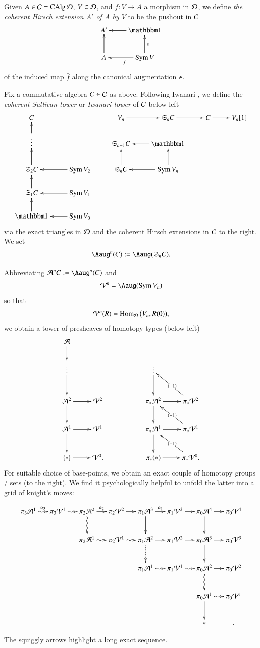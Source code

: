 \begin{ssDefinition}
\label{BE44}
Given $A \in \mathcal{C} = \operatorname{CAlg} \mathcal{D}$, $V \in \mathcal{D}$, and $f: V \to A$ a morphism in $\mathcal{D}$, we define \emph{the coherent Hirsch extension $A'$ of $A$ by $V$} to be the pushout in $\mathcal{C}$ 
\[
\xymatrix{
A' & \one \ar[l]
\\
A \ar[u] & \Sym V \ar[l]^{\bar f} \ar[u]_-\ep
}
\]
of the induced map $\bar f$ along the canonical augmentation $\epsilon$. 
\end{ssDefinition}


\label{BB34}
Fix a commutative algebra $C \in \mathcal{C}$ as above. Following Iwanari \cite{Iwanari}, we define the \emph{coherent Sullivan tower} or \emph{Iwanari tower} of $\mathcal{C}$ below left 
\[
\xymatrix
@ R = 4ex
{
C 
&& V_n \ar[r] & \fkS_n C \ar[r] & C \ar[r] & V_n[1]
\\
\vdots \ar[u] && \fkS_{n+1}C  & \one \ar[l] 
\\ 
\fkS_2 C \ar[u] & \Sym V_2 \ar[l] & \fkS_n C \ar[u] & \Sym V_n \ar[l] \ar[u].
\\
\fkS_1 C \ar[u] & \Sym V_1 \ar[l] 
\\
\one \ar[u] & \Sym V_0 \ar[l]
}
\]
via the exact triangles in $\mathcal{D}$ and the coherent Hirsch extensions in $\mathcal{C}$ to the right. We set 
\[
\Aaug^n(C) := \Aaug(\fkS_n C).
\]

\label{BB35}
Abbreviating $\Aa^nC:= \Aaug^n(C)$ and
\[
\Vv^n = \Aaug(\Sym V_n) 
\]
so that
\[
\mathcal{V}^n(R) = \operatorname{Hom}_{\mathcal{D}} \big( V_n, R(0) \big),
\]
we obtain a tower of presheaves of homotopy types (below left)
\[
\xymatrix{
\Aa \ar[d]
\\
\vdots \ar[d] &
&&
\vdots \ar[d]
\\
\Aa^2 \ar[d] \ar[r] & \Vv^2
&& 
\pi_* \Aa^2 \ar[d] \ar[r] & \pi_* \Vv^2 \ar[ul]|{(-1)}
\\
\Aa^1 \ar[d] \ar[r] & \Vv^1
&&
\pi_*\Aa^1 \ar[d] \ar[r] & \pi_* \Vv^1 \ar[ul]|{(-1)}
\\
\{\ast\} \ar[r] & \Vv^0.
&&
\pi_*(\ast) \ar[r] & \pi_*\Vv^0. \ar[ul]|{(-1)}
}
\]
For suitable choice of base-points, we obtain an exact couple of homotopy groups / sets (to the right). We find it psychologically helpful to unfold the latter into a grid of knight's moves:
\begin{footnotesize}
\[
\xymatrix
@ C = 3ex
{
\pi_3 \Aa^1 \ar@{~>}[r]^-{\al_3} &
\pi_3 \Vv^1 \ar@{~>}[r] &
\pi_2 \Aa^2 \ar[r]^-{\al_2} \ar@{~>}[d] &
\pi_2\Vv^2 \ar[r] & \pi_1 \Aa^3 \ar[r]^-{\al_1} \ar[d] & \pi_1 \Vv^3 \ar[r] & \pi_0 \Aa^4 \ar[r] \ar[d] & \pi_0 \Vv^4
\\
&&
\pi_2 \Aa^1 \ar@{~>}[r] 
&
\pi_2\Vv^1 \ar@{~>}[r] & \pi_1 \Aa^2 \ar[r] \ar@{~>}[d] & \pi_1 \Vv^2 \ar[r] & \pi_0 \Aa^3 \ar[r] \ar[d] & \pi_0 \Vv^3
\\
&&&& 
\pi_1 \Aa^1 \ar@{~>}[r] & \pi_1 \Vv^1 \ar@{~>}[r] & \pi_0 \Aa^2 \ar[r] \ar@{~>}[d] & \pi_0 \Vv^2
\\
&&&&&& 
\pi_0 \Aa^1 \ar@{~>}[r] \ar[d] & \pi_0 \Vv^1
\\
&&&&&& \ast &.
}
\]
\end{footnotesize}
\noindent The squiggly arrows highlight a long exact sequence. 

